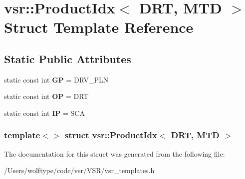 \hypertarget{structvsr_1_1_product_idx_3_01_d_r_t_00_01_m_t_d_01_4}{\section{vsr\-:\-:Product\-Idx$<$ D\-R\-T, M\-T\-D $>$ Struct Template Reference}
\label{structvsr_1_1_product_idx_3_01_d_r_t_00_01_m_t_d_01_4}
}
\subsection*{Static Public Attributes}
\begin{DoxyCompactItemize}
\item 
\hypertarget{structvsr_1_1_product_idx_3_01_d_r_t_00_01_m_t_d_01_4_a3a042e0b0f9841562cbcb8de1b2d3e57}{static const int {\bfseries G\-P} = D\-R\-V\-\_\-\-P\-L\-N}\label{structvsr_1_1_product_idx_3_01_d_r_t_00_01_m_t_d_01_4_a3a042e0b0f9841562cbcb8de1b2d3e57}

\item 
\hypertarget{structvsr_1_1_product_idx_3_01_d_r_t_00_01_m_t_d_01_4_ad0420cf2dc2de458e02afea2289dbea4}{static const int {\bfseries O\-P} = D\-R\-T}\label{structvsr_1_1_product_idx_3_01_d_r_t_00_01_m_t_d_01_4_ad0420cf2dc2de458e02afea2289dbea4}

\item 
\hypertarget{structvsr_1_1_product_idx_3_01_d_r_t_00_01_m_t_d_01_4_a7e88b3f0ef8d6c2eef65b0ae1116bc71}{static const int {\bfseries I\-P} = S\-C\-A}\label{structvsr_1_1_product_idx_3_01_d_r_t_00_01_m_t_d_01_4_a7e88b3f0ef8d6c2eef65b0ae1116bc71}

\end{DoxyCompactItemize}
\subsubsection*{template$<$$>$ struct vsr\-::\-Product\-Idx$<$ D\-R\-T, M\-T\-D $>$}



The documentation for this struct was generated from the following file\-:\begin{DoxyCompactItemize}
\item 
/\-Users/wolftype/code/vsr/\-V\-S\-R/vsr\-\_\-templates.\-h\end{DoxyCompactItemize}

